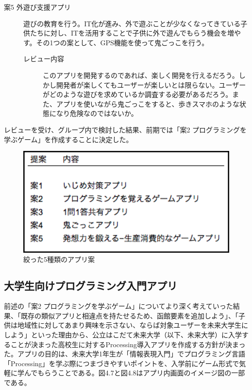 \documentclass[openany,11pt,papersize]{jsbook}
\begin{document}
\begin{description}
 \item[案5 外遊び支援アプリ]
遊びの教育を行う。IT化が進み、外で遊ぶことが少なくなってきている子供たちに対し、ITを活用することで子供に外で遊んでもらう機会を増やす。その1つの案として、GPS機能を使って鬼ごっこを行う。
	\begin{description}
 	\item[レビュー内容]
	このアプリを開発するのであれば、楽しく開発を行えるだろう。しかし開発者が楽しくてもユーザーが楽しいとは限らない。ユーザーがどのような遊びを求めているか調査する必要があるだろう。また、アプリを使いながら鬼ごっこをすると、歩きスマホのような状態になり危険なのではないか。
	 \end{description}

 \end{description}
 
 \par レビューを受け、グループ内で検討した結果、前期では「案2 プログラミングを学ぶゲーム」を作成することに決定した。
 
 \begin{figure}[H]
\begin{center}
\includegraphics[width=12cm, bb=0 0 329 162]{img/AppIdea.png}
\end{center}
\caption{絞った5種類のアプリ案}
\end{figure}
 
 
 \subsection{大学生向けプログラミング入門アプリ}
\par 前述の「案2 プログラミングを学ぶゲーム」についてより深く考えていった結果、「既存の類似アプリと相違点を持たせるため、函館要素を追加しよう」、「子供は地域性に対してあまり興味を示さない、ならば対象ユーザーを未来大学生にしよう」といった理由から、公立はこだて未来大学（以下、未来大学）に入学することが決まった高校生に対するProcessing導入アプリを作成する方針が決まった。アプリの目的は、未来大学1年生が「情報表現入門」でプログラミング言語「Processing」を学ぶ際につまづきやすいポイントを、入学前にゲーム形式で気軽に学んでもらうことである。図4.7と図4.8はアプリ内画面のイメージ図の一部である。
\end{document}
